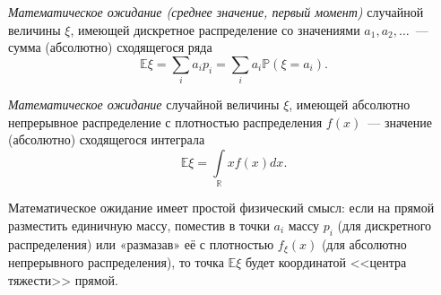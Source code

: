 \begin{defn}
    {\it Математическое ожидание (среднее значение, первый момент)} случайной величины $\xi$, имеющей дискретное распределение со значениями $a_1, a_2, \ldots$~--- сумма (абсолютно) сходящегося ряда
    \begin{equation*}
        \mathbb{E} \xi=\sum\limits_{i} a_{i} p_{i}=\sum\limits_{i} a_{i} \mathbb{P}\left(\xi=a_{i}\right).
    \end{equation*}
\end{defn}

\begin{defn}
    {\it Математическое ожидание} случайной величины $\xi$, имеющей абсолютно непрерывное распределение с плотностью распределения $f(x)$~--- значение (абсолютно) сходящегося интеграла
    \begin{equation*}
        \mathbb{E} \xi=\int\limits_{\mathbb{R}} x f(x) dx.
    \end{equation*}
\end{defn}

Математическое ожидание имеет простой физический смысл: если на прямой разместить единичную массу, поместив в точки $a_i$ массу $p_i$ (для дискретного распределения) или «размазав» её с плотностью $f_\xi(x)$ (для абсолютно непрерывного распределения), то точка $\mathbb{E}\xi$ будет координатой <<центра тяжести>> прямой.

